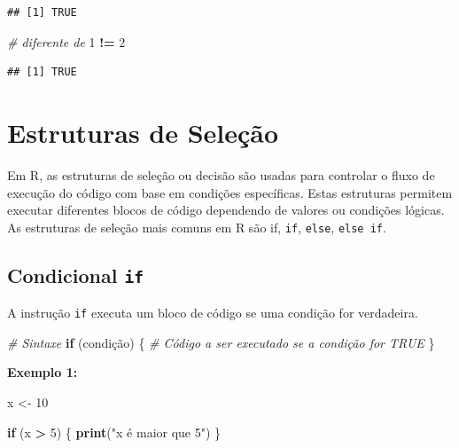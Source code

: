 \documentclass[
]{book}
\newenvironment{Shaded}{\begin{snugshade}}{\end{snugshade}}
\newcommand{\CommentTok}[1]{\textcolor[rgb]{0.56,0.35,0.01}{\textit{#1}}}
\newcommand{\ControlFlowTok}[1]{\textcolor[rgb]{0.13,0.29,0.53}{\textbf{#1}}}
\newcommand{\DecValTok}[1]{\textcolor[rgb]{0.00,0.00,0.81}{#1}}
\newcommand{\FunctionTok}[1]{\textcolor[rgb]{0.13,0.29,0.53}{\textbf{#1}}}
\newcommand{\NormalTok}[1]{#1}
\newcommand{\OtherTok}[1]{\textcolor[rgb]{0.56,0.35,0.01}{#1}}
\newcommand{\SpecialCharTok}[1]{\textcolor[rgb]{0.81,0.36,0.00}{\textbf{#1}}}
\newcommand{\StringTok}[1]{\textcolor[rgb]{0.31,0.60,0.02}{#1}}
\theoremstyle{definition}
\theoremstyle{definition}
\theoremstyle{definition}
\theoremstyle{definition}
\theoremstyle{remark}
\begin{document}
\begin{verbatim}
## [1] TRUE
\end{verbatim}

\begin{Shaded}
\begin{Highlighting}[]
\CommentTok{\# diferente de}
\DecValTok{1} \SpecialCharTok{!=} \DecValTok{2}
\end{Highlighting}
\end{Shaded}

\begin{verbatim}
## [1] TRUE
\end{verbatim}

\chapter{Estruturas de Seleção}\label{estruturas-de-seleuxe7uxe3o}

Em R, as estruturas de seleção ou decisão são usadas para controlar o fluxo de execução do código com base em condições específicas. Estas estruturas permitem executar diferentes blocos de código dependendo de valores ou condições lógicas. As estruturas de seleção mais comuns em R são if, \texttt{if}, \texttt{else}, \texttt{else\ if}.

\section{\texorpdfstring{Condicional \texttt{if}}{Condicional if}}\label{condicional-if}

A instrução \texttt{if} executa um bloco de código se uma condição for verdadeira.

\begin{Shaded}
\begin{Highlighting}[]
\CommentTok{\# Sintaxe   }
\ControlFlowTok{if}\NormalTok{ (condição) \{}
      \CommentTok{\# Código a ser executado se a condição for TRUE}
\NormalTok{\}}
\end{Highlighting}
\end{Shaded}

\textbf{Exemplo 1:}

\begin{Shaded}
\begin{Highlighting}[]
\NormalTok{x }\OtherTok{\textless{}{-}} \DecValTok{10}

\ControlFlowTok{if}\NormalTok{ (x }\SpecialCharTok{\textgreater{}} \DecValTok{5}\NormalTok{) \{}
      \FunctionTok{print}\NormalTok{(}\StringTok{"x é maior que 5"}\NormalTok{)}
\NormalTok{\}}
\end{Highlighting}
\end{Shaded}
\end{document}

